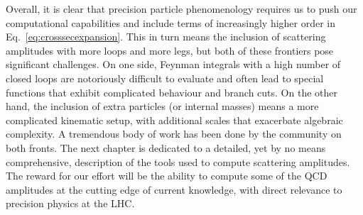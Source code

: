 \documentclass[main.tex]{subfiles}
\begin{document}
Overall, it is clear that precision particle phenomenology requires us to push our computational capabilities and include terms of increasingly higher order in Eq.~\ref{eq:crosssecexpansion}. This in turn means the inclusion of scattering amplitudes with more loops and more legs, but both of these frontiers pose significant challenges. On one side, Feynman integrals with a high number of closed loops are notoriously difficult to evaluate and often lead to special functions that exhibit complicated behaviour and branch cuts. On the other hand, the inclusion of extra particles (or internal masses) means a more complicated kinematic setup, with additional scales that exacerbate algebraic complexity.  A tremendous body of work has been done by the community on both fronts. The next chapter is dedicated to a detailed, yet by no means comprehensive, description of the tools used to compute scattering amplitudes. The reward for our effort will be the ability to compute some of the QCD amplitudes at the cutting edge of current knowledge, with direct relevance to precision physics at the LHC.
\end{document}
